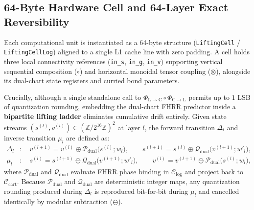 \documentclass[11pt, a4paper]{article}
\begin{document}
\subsection{64-Byte Hardware Cell and 64-Layer Exact Reversibility}
Each computational unit is instantiated as a 64-byte structure (\texttt{LiftingCell} / \texttt{LiftingCellLog}) aligned to a single L1 cache line with zero padding. A cell holds three local connectivity references (\texttt{in\_s}, \texttt{in\_g}, \texttt{in\_v}) supporting vertical sequential composition ($\circ$) and horizontal monoidal tensor coupling ($\otimes$), alongside its dual-chart state registers and curried bond parameters.

Crucially, although a single standalone call to $\Phi_{\mathrm{L}\to\mathrm{C}} \circ \Phi_{\mathrm{C}\to\mathrm{L}}$ permits up to $1\text{ LSB}$ of quantization rounding, embedding the dual-chart FHRR predictor inside a \textbf{bipartite lifting ladder} eliminates cumulative drift entirely. Given state streams $(s^{(l)}, v^{(l)}) \in (\mathbb{Z}/2^{16}\mathbb{Z})^2$ at layer $l$, the forward transition $\Delta_l$ and inverse transition $\mu_l$ are defined as:
\begin{align}
    \Delta_l &: \quad v^{(l+1)} = v^{(l)} \oplus \mathcal{P}_{\mathrm{dual}}\bigl(s^{(l)}; w_l\bigr), \qquad
               s^{(l+1)} = s^{(l)} \oplus \mathcal{Q}_{\mathrm{dual}}\bigl(v^{(l+1)}; w'_l\bigr), \\
    \mu_l &: \quad s^{(l)} = s^{(l+1)} \ominus \mathcal{Q}_{\mathrm{dual}}\bigl(v^{(l+1)}; w'_l\bigr), \qquad
             v^{(l)} = v^{(l+1)} \ominus \mathcal{P}_{\mathrm{dual}}\bigl(s^{(l)}; w_l\bigr),
\end{align}
where $\mathcal{P}_{\mathrm{dual}}$ and $\mathcal{Q}_{\mathrm{dual}}$ evaluate FHRR phase binding in $\mathcal{C}_{\mathrm{log}}$ and project back to $\mathcal{C}_{\mathrm{cart}}$. Because $\mathcal{P}_{\mathrm{dual}}$ and $\mathcal{Q}_{\mathrm{dual}}$ are deterministic integer maps, any quantization rounding produced during $\Delta_l$ is reproduced bit-for-bit during $\mu_l$ and cancelled identically by modular subtraction ($\ominus$).
\end{document}

